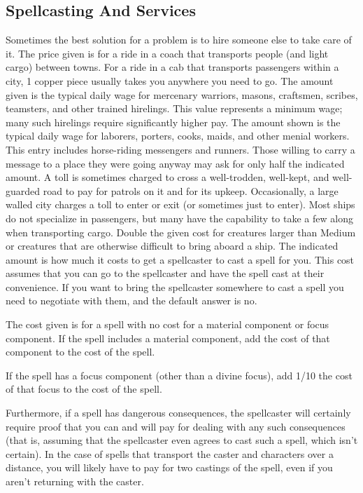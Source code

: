     \subsection{Spellcasting And Services}
        Sometimes the best solution for a problem is to hire someone else to take care of it.
         The price given is for a ride in a coach that transports people (and light cargo) between towns. For a ride in a cab that transports passengers within a city, 1 copper piece usually takes you anywhere you need to go.
         The amount given is the typical daily wage for mercenary warriors, masons, craftsmen, scribes, teamsters, and other trained hirelings. This value represents a minimum wage; many such hirelings require significantly higher pay.
         The amount shown is the typical daily wage for laborers, porters, cooks, maids, and other menial workers.
         This entry includes horse-riding messengers and runners. Those willing to carry a message to a place they were going anyway may ask for only half the indicated amount.
         A toll is sometimes charged to cross a well-trodden, well-kept, and well-guarded road to pay for patrols on it and for its upkeep. Occasionally, a large walled city charges a toll to enter or exit (or sometimes just to enter).
         Most ships do not specialize in passengers, but many have the capability to take a few along when transporting cargo. Double the given cost for creatures larger than Medium or creatures that are otherwise difficult to bring aboard a ship.
         The indicated amount is how much it costs to get a spellcaster to cast a spell for you. This cost assumes that you can go to the spellcaster and have the spell cast at their convenience. If you want to bring the spellcaster somewhere to cast a spell you need to negotiate with them, and the default answer is no.
        \par The cost given is for a spell with no cost for a material component or focus component. If the spell includes a material component, add the cost of that component to the cost of the spell.
        \par If the spell has a focus component (other than a divine focus), add 1/10 the cost of that focus to the cost of the spell.
        \par Furthermore, if a spell has dangerous consequences, the spellcaster will certainly require proof that you can and will pay for dealing with any such consequences (that is, assuming that the spellcaster even agrees to cast such a spell, which isn't certain). In the case of spells that transport the caster and characters over a distance, you will likely have to pay for two castings of the spell, even if you aren't returning with the caster.
